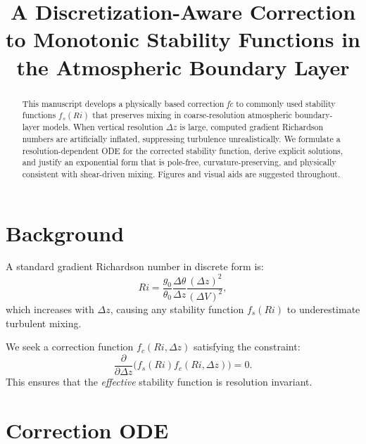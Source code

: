 \documentclass[12pt]{article}
\title{A Discretization-Aware Correction to Monotonic Stability Functions in the Atmospheric Boundary Layer}
\author{}
\date{}
\begin{document}
\maketitle

\begin{abstract}
This manuscript develops a physically based correction \emph{fc} to commonly used stability functions \(f_s(Ri)\) that preserves mixing in coarse-resolution atmospheric boundary-layer models. When vertical resolution \(\Delta z\) is large, computed gradient Richardson numbers are artificially inflated, suppressing turbulence unrealistically. We formulate a resolution-dependent ODE for the corrected stability function, derive explicit solutions, and justify an exponential form that is pole-free, curvature-preserving, and physically consistent with shear-driven mixing. Figures and visual aids are suggested throughout.
\end{abstract}

\section{Background}

A standard gradient Richardson number in discrete form is:
\begin{equation}
    Ri = \frac{g_0}{\theta_0} \frac{\Delta \theta}{\Delta z} \frac{(\Delta z)^2}{(\Delta V)^2},
\end{equation}
which increases with \(\Delta z\), causing any stability function \(f_s(Ri)\) to underestimate turbulent mixing.

We seek a correction function \(f_c(Ri, \Delta z)\) satisfying the constraint:
\begin{equation}
    \frac{\partial}{\partial \Delta z}\big(f_s(Ri) f_c(Ri,\Delta z)\big) = 0.
\end{equation}
This ensures that the \emph{effective} stability function is resolution invariant.

\section{Correction ODE}
\end{document}
